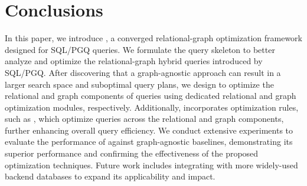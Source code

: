 
\section{Conclusions}
\label{sec:conclusions}

In this paper, we introduce \name, a converged relational-graph optimization framework designed for SQL/PGQ queries. We formulate the \spjm query skeleton to better analyze and optimize the relational-graph hybrid queries introduced by SQL/PGQ. After discovering that a graph-agnostic approach can result in a larger search space and suboptimal query plans, we design \name to optimize the relational and graph components of \spjm queries using dedicated relational and graph optimization modules, respectively. Additionally, \name incorporates optimization rules, such as \filterrule, which optimize queries across the relational and graph components, further enhancing overall query efficiency. We conduct extensive experiments to evaluate the performance of \name against graph-agnostic baselines, demonstrating its superior performance and confirming the effectiveness of the proposed optimization techniques. Future work includes integrating \name with more widely-used backend databases to expand its applicability and impact.

\balance